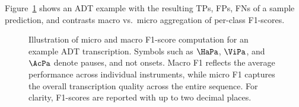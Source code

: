Figure~\ref{F1Figure} shows an \gls{ADT} example with the resulting \glspl{TP}, \glspl{FP}, \glspl{FN} of a sample prediction, and contrasts macro vs.\ micro aggregation of per-class F1-scores.

\begin{figure}[H]
    \centering
    \hspace*{-0.5cm}
    
    \caption{Illustration of micro and macro F1-score computation for an example \gls{ADT} transcription. Symbols such as $\HaPa$, $\ViPa$, and $\AcPa$ denote pauses, and not onsets. Macro F1 reflects the average performance across individual instruments, while micro F1 captures the overall transcription quality across the entire sequence. For clarity, F1-scores are reported with up to two decimal places.}
    \label{F1Figure}
\end{figure}